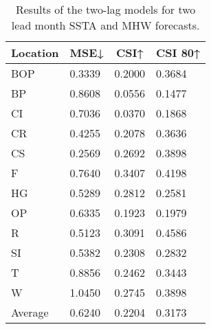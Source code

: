 \documentclass[11pt, a4paper]{article}
\begin{document}
\begin{table}[H]
\centering
\small
\caption{Results of the two-lag models for two lead month SSTA and MHW forecasts.}
\begin{tabular}{llll}
\multicolumn{1}{c}{\textbf{Location}} & \multicolumn{1}{c}{\textbf{MSE↓}} & \multicolumn{1}{c}{\textbf{CSI↑}} & \multicolumn{1}{c}{\textbf{CSI 80↑}} \\ \hline
BOP                         & 0.3339                            & 0.2000                            & 0.3684                               \\
BP                        & 0.8608                            & 0.0556                            & 0.1477                               \\
CI                        & 0.7036                            & 0.0370                            & 0.1868                               \\
CR                           & 0.4255                            & 0.2078                            & 0.3636                               \\
CS                           & 0.2569                            & 0.2692                            & 0.3898                               \\
F                             & 0.7640                            & 0.3407                            & 0.4198                               \\
HG                          & 0.5289                            & 0.2812                            & 0.2581                               \\
OP                       & 0.6335                            & 0.1923                            & 0.1979                               \\
R                                & 0.5123                            & 0.3091                            & 0.4586                               \\
SI                        & 0.5382                            & 0.2308                            & 0.2832                               \\
T                              & 0.8856                            & 0.2462                            & 0.3443                               \\
W                             & 1.0450 	                          & 0.2745                            & 0.3898                               \\ \hline
Average                               & 0.6240                            & 0.2204                            & 0.3173
\end{tabular}
\end{table}
\end{document}
